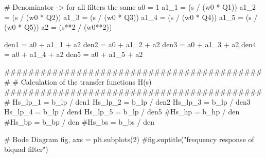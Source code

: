 \documentclass[
  letterpaper,
]{scrbook}
\newenvironment{Shaded}{}{}
\newcommand{\CommentTok}[1]{\textcolor[rgb]{0.42,0.45,0.49}{#1}}
\newcommand{\DecValTok}[1]{\textcolor[rgb]{0.00,0.36,0.77}{#1}}
\newcommand{\NormalTok}[1]{\textcolor[rgb]{0.14,0.16,0.18}{#1}}
\newcommand{\OperatorTok}[1]{\textcolor[rgb]{0.14,0.16,0.18}{#1}}
\begin{document}
\begin{codelisting}
{\begin{Shaded}
\begin{Highlighting}[]
\CommentTok{\# Denominator {-}\textgreater{} for all filters the same}
\NormalTok{a0 }\OperatorTok{=} \DecValTok{1}
\NormalTok{a1\_1 }\OperatorTok{=}\NormalTok{ (s }\OperatorTok{/}\NormalTok{ (w0 }\OperatorTok{*}\NormalTok{ Q1))}
\NormalTok{a1\_2 }\OperatorTok{=}\NormalTok{ (s }\OperatorTok{/}\NormalTok{ (w0 }\OperatorTok{*}\NormalTok{ Q2))}
\NormalTok{a1\_3 }\OperatorTok{=}\NormalTok{ (s }\OperatorTok{/}\NormalTok{ (w0 }\OperatorTok{*}\NormalTok{ Q3))}
\NormalTok{a1\_4 }\OperatorTok{=}\NormalTok{ (s }\OperatorTok{/}\NormalTok{ (w0 }\OperatorTok{*}\NormalTok{ Q4))}
\NormalTok{a1\_5 }\OperatorTok{=}\NormalTok{ (s }\OperatorTok{/}\NormalTok{ (w0 }\OperatorTok{*}\NormalTok{ Q5))}
\NormalTok{a2 }\OperatorTok{=}\NormalTok{ (s}\OperatorTok{**}\DecValTok{2} \OperatorTok{/}\NormalTok{ (w0}\OperatorTok{**}\DecValTok{2}\NormalTok{))}

\NormalTok{den1 }\OperatorTok{=}\NormalTok{ a0 }\OperatorTok{+}\NormalTok{ a1\_1 }\OperatorTok{+}\NormalTok{ a2}
\NormalTok{den2 }\OperatorTok{=}\NormalTok{ a0 }\OperatorTok{+}\NormalTok{ a1\_2 }\OperatorTok{+}\NormalTok{ a2}
\NormalTok{den3 }\OperatorTok{=}\NormalTok{ a0 }\OperatorTok{+}\NormalTok{ a1\_3 }\OperatorTok{+}\NormalTok{ a2}
\NormalTok{den4 }\OperatorTok{=}\NormalTok{ a0 }\OperatorTok{+}\NormalTok{ a1\_4 }\OperatorTok{+}\NormalTok{ a2}
\NormalTok{den5 }\OperatorTok{=}\NormalTok{ a0 }\OperatorTok{+}\NormalTok{ a1\_5 }\OperatorTok{+}\NormalTok{ a2}

\CommentTok{\#\#\#\#\#\#\#\#\#\#\#\#\#\#\#\#\#\#\#\#\#\#\#\#\#\#\#\#\#\#\#\#\#\#\#\#\#\#\#\#\#\#\#\#}
\CommentTok{\# Calculation of the transfer functions H(s)}
\CommentTok{\#\#\#\#\#\#\#\#\#\#\#\#\#\#\#\#\#\#\#\#\#\#\#\#\#\#\#\#\#\#\#\#\#\#\#\#\#\#\#\#\#\#\#\#}
\NormalTok{Hs\_lp\_1 }\OperatorTok{=}\NormalTok{ b\_lp }\OperatorTok{/}\NormalTok{ den1}
\NormalTok{Hs\_lp\_2 }\OperatorTok{=}\NormalTok{ b\_lp }\OperatorTok{/}\NormalTok{ den2}
\NormalTok{Hs\_lp\_3 }\OperatorTok{=}\NormalTok{ b\_lp }\OperatorTok{/}\NormalTok{ den3}
\NormalTok{Hs\_lp\_4 }\OperatorTok{=}\NormalTok{ b\_lp }\OperatorTok{/}\NormalTok{ den4}
\NormalTok{Hs\_lp\_5 }\OperatorTok{=}\NormalTok{ b\_lp }\OperatorTok{/}\NormalTok{ den5}
\CommentTok{\#Hs\_hp = b\_hp / den}
\CommentTok{\#Hs\_bp = b\_bp / den}
\CommentTok{\#Hs\_bs = b\_bs / den}

\CommentTok{\# Bode Diagram}
\NormalTok{fig, axs }\OperatorTok{=}\NormalTok{ plt.subplots(}\DecValTok{2}\NormalTok{)}
\CommentTok{\#fig.suptitle("frequency response of biquad filter")}


\end{Highlighting}
\end{Shaded}}
\end{codelisting}
\end{document}
